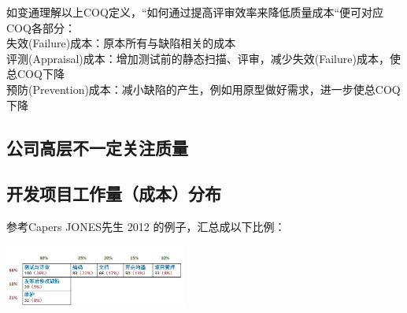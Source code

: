 如变通理解以上COQ定义，``如何通过提高评审效率来降低质量成本``便可对应COQ各部分：\\
失效(Failure)成本：原本所有与缺陷相关的成本\\
评测(Appraisal)成本：增加测试前的静态扫描、评审，减少失效(Failure)成本，使总COQ下降\\
预防(Prevention)成本：减小缺陷的产生，例如用原型做好需求，进一步使总COQ下降\\

\hypertarget{ux516cux53f8ux9ad8ux5c42ux4e0dux4e00ux5b9aux5173ux6ce8ux8d28ux91cf}{%
\subsection{公司高层不一定关注质量}\label{ux516cux53f8ux9ad8ux5c42ux4e0dux4e00ux5b9aux5173ux6ce8ux8d28ux91cf}}


\hypertarget{ux5f00ux53d1ux9879ux76eeux5de5ux4f5cux91cfux6210ux672cux5206ux5e03}{%
\subsection{开发项目工作量（成本）分布}\label{ux5f00ux53d1ux9879ux76eeux5de5ux4f5cux91cfux6210ux672cux5206ux5e03}}

参考Capers JONES先生 2012 的例子，汇总成以下比例：

\includegraphics[width=6cm]{AR1成本占比.jpg}

